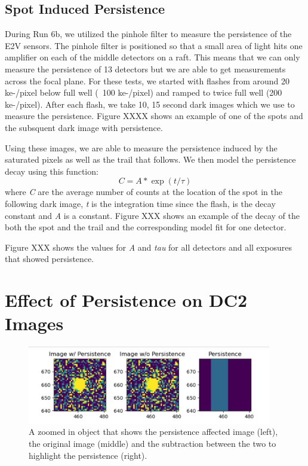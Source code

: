 \documentclass[DM,authoryear,toc]{lsstdoc}
\begin{document}
\subsection[]{Spot Induced Persistence}
During Run 6b, we utilized the pinhole filter to measure the persistence of the E2V sensors.
The pinhole filter is positioned so that a small area of light hits one amplifier on each of the middle detectors on a raft.
This means that we can only measure the persistence of 13 detectors but we are able to get measurements across the focal plane.
For these tests, we started with flashes from around 20 ke-/pixel below full well (~100 ke-/pixel) and ramped to twice full well (200 ke-/pixel).
After each flash, we take 10, 15 second dark images which we use to measure the persistence.
Figure XXXX shows an example of one of the spots and the subsquent dark image with persistence.

Using these images, we are able to measure the persistence induced by the saturated pixels as well as the trail that follows.
We then model the persistence decay using this function:
\begin{equation*}
  C= A * \exp(t/\tau)
\end{equation*}
where \textit{C} are the average number of counts at the location of the spot in the following dark image, \textit{t} is the integration time since the flash, \textit{\tau} is the decay constant and \textit{A} is a constant.
Figure XXX shows an example of the decay of the both the spot and the trail and the corresponding model fit for one detector.

Figure XXX shows the values for \textit{A} and \textit{tau} for all detectors and all exposures that showed persistence.
\section{Effect of Persistence on DC2 Images}

\begin{figure}[!htp]
  \centering
  \includegraphics[width=0.95\textwidth, angle=0]{Obj_pers.png}
  \caption{
  A zoomed in object that shows the persistence affected image (left), the original image (middle) 
  and the subtraction between the two to highlight the persistence (right).
  }\label{fig:ex_persistence}
\end{figure}
\end{document}
